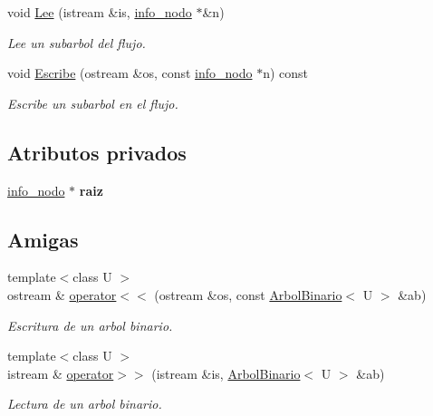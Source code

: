 \begin{DoxyCompactItemize}
void \hyperlink{classArbolBinario_a4bc2c798ca826b372308d4c26e0ff4cb}{Lee} (istream \&is, \hyperlink{structArbolBinario_1_1info__nodo}{info\+\_\+nodo} $\ast$\&n)
\begin{DoxyCompactList}\small\item\em Lee un subarbol del flujo. \end{DoxyCompactList}\item 
void \hyperlink{classArbolBinario_a7f3b03ed5ed75ad3ea38c18f93470616}{Escribe} (ostream \&os, const \hyperlink{structArbolBinario_1_1info__nodo}{info\+\_\+nodo} $\ast$n) const
\begin{DoxyCompactList}\small\item\em Escribe un subarbol en el flujo. \end{DoxyCompactList}\end{DoxyCompactItemize}
\subsection*{Atributos privados}
\begin{DoxyCompactItemize}
\item 
\mbox{\label{classArbolBinario_a116619c6d1e1f8af4ebc95399a062801}} 
\hyperlink{structArbolBinario_1_1info__nodo}{info\+\_\+nodo} $\ast$ {\bfseries raiz}
\end{DoxyCompactItemize}
\subsection*{Amigas}
\begin{DoxyCompactItemize}
\item 
{\footnotesize template$<$class U $>$ }\\ostream \& \hyperlink{classArbolBinario_a58c82e89a546bd6f38ad116466eabcb8}{operator$<$$<$} (ostream \&os, const \hyperlink{classArbolBinario}{Arbol\+Binario}$<$ U $>$ \&ab)
\begin{DoxyCompactList}\small\item\em Escritura de un arbol binario. \end{DoxyCompactList}\item 
{\footnotesize template$<$class U $>$ }\\istream \& \hyperlink{classArbolBinario_a917493bedd4f7e4430d3283f367ce599}{operator$>$$>$} (istream \&is, \hyperlink{classArbolBinario}{Arbol\+Binario}$<$ U $>$ \&ab)
\begin{DoxyCompactList}\small\item\em Lectura de un arbol binario. \end{DoxyCompactList}\end{DoxyCompactItemize}


